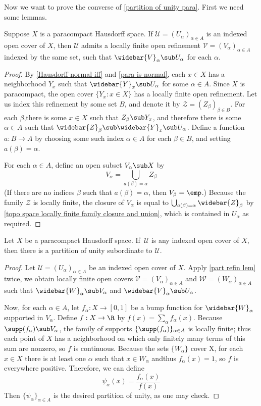 Now we want to prove the converse of \cref{partition of unity para}. First we need some lemmas.
\begin{lemma}\label{part refin lem}
Suppose $X$ is a paracompact Hausdorff space. If $\mathcal{U}=(U_\alpha)_{\alpha\in A}$ is an indexed open cover of $X$, then $\mathcal{U}$ admits a locally finite open refinement $\mathcal{V}=(V_\alpha)_{\alpha\in A}$ indexed by the same set, such that $\widebar{V}_\alpha\sub U_\alpha$ for each $\alpha$.
\end{lemma}
\begin{proof}
By \cref{Hausdorff normal iff} and \cref{para is normal}, each $x\in X$ has a neighborhood $Y_x$ such that $\widebar{Y}_x\sub U_\alpha$ for some $\alpha\in A$. Since $X$ is paracompact, the open cover $\{Y_x:x\in X\}$ has a locally finite open refinement. Let us index this refinement by some set $B$, and denote it by $\mathcal{Z}=(Z_\beta)_{\beta\in B}$. For each $\beta$,there is some $x\in X$ such that $Z_\beta\sub Y_x$, and therefore there is some $\alpha\in A$ such that
$\widebar{Z}_\beta\sub \widebar{Y}_x\sub U_\alpha$. Define a function $a:B\to A$ by choosing some such index $\alpha\in A$ for each $\beta\in B$, and setting $a(\beta)=\alpha$.\par
For each $\alpha\in A$, define an open subset $V_\alpha\sub X$ by
\[V_\alpha=\bigcup_{a(\beta)=\alpha}Z_\beta\]
(If there are no indices $\beta$ such that $a(\beta)=\alpha$, then $V_\beta=\emp$.) Because the family $\mathcal{Z}$ is locally finite, the closure of $V_\alpha$ is equal to $\bigcup_{a(\beta)=\alpha}\widebar{Z}_{\beta}$ by \cref{topo space locally finite family closure and union}, which is contained in $U_\alpha$ as required.
\end{proof}
\begin{theorem}\label{partition of unity}
Let $X$ be a paracompact Hausdorff space. If $\,\mathcal{U}$ is any indexed open cover of $X$, then there is a partition of unity subordinate to $\mathcal{U}$.
\end{theorem}
\begin{proof}
Let $\mathcal{U}=(U_\alpha)_{\alpha\in A}$ be an indexed open cover of $X$. Apply \cref{part refin lem} twice, we obtain locally finite open covers $\mathcal{V}=(V_\alpha)_{\alpha\in A}$ and $\mathcal{W}=(W_\alpha)_{\alpha\in A}$ such that $\widebar{W}_\alpha\sub V_\alpha$ and $\widebar{V}_\alpha\sub U_\alpha$.\par
Now, for each $\alpha\in A$, let $f_\alpha:X\to[0,1]$ be a bump function for $\widebar{W}_\alpha$ supported in $V_\alpha$. Define $f:X\to\R$ by $f(x)=\sum_\alpha f_\alpha(x)$. Because $\supp(f_\alpha)\sub V_\alpha$, the family of supports $\{\supp(f_\alpha)\}_{\alpha\in A}$ is locally finite; thus each point of $X$ has a neighborhood on which only finitely many terms of this sum are nonzero, so $f$ is continuous. Because
the sets $\{W_\alpha\}$ cover X, for each $x\in X$ there is at least one $\alpha$ such that $x\in W_\alpha$ andthus $f_\alpha(x)=1$, so $f$ is everywhere positive. Therefore, we can define 
\[\psi_\alpha(x)=\dfrac{f_\alpha(x)}{f(x)}\]
Then $\{\psi_\alpha\}_{\alpha\in A}$ is the desired partition of unity, as one may check.
\end{proof}
